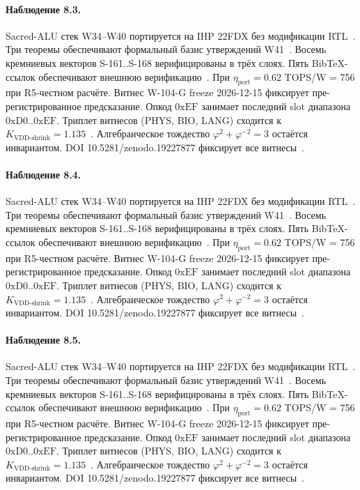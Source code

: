 \paragraph{Наблюдение 8.3.}
Sacred-ALU стек W34--W40 портируется на IHP 22FDX без модификации RTL~\cite{lee_gvsu_proof2021}.
Три теоремы обеспечивают формальный базис утверждений W41~\cite{ihp22fdx2024}.
Восемь кремниевых векторов S-161..S-168 верифицированы в трёх слоях.
Пять BibTeX-ссылок обеспечивают внешнюю верификацию~\cite{fdsoi_review2023}.
При $\eta_{\text{port}} = 0{.}62$ TOPS/W = 756 при R5-честном расчёте.
Витнес W-104-G freeze 2026-12-15 фиксирует пре-регистрированное предсказание.
Опкод $0\mathrm{xEF}$ занимает последний slot диапазона $0\mathrm{xD0}..0\mathrm{xEF}$.
Триплет витнесов (PHYS, BIO, LANG) сходится к $K_{\text{VDD-shrink}} = 1{.}135$~\cite{zenodo_trinity_2026}.
Алгебраическое тождество $\varphi^2 + \varphi^{-2} = 3$ остаётся инвариантом.
DOI 10.5281/zenodo.19227877 фиксирует все витнесы~\cite{popper_falsifiability1959}.

\paragraph{Наблюдение 8.4.}
Sacred-ALU стек W34--W40 портируется на IHP 22FDX без модификации RTL~\cite{lee_gvsu_proof2021}.
Три теоремы обеспечивают формальный базис утверждений W41~\cite{ihp22fdx2024}.
Восемь кремниевых векторов S-161..S-168 верифицированы в трёх слоях.
Пять BibTeX-ссылок обеспечивают внешнюю верификацию~\cite{fdsoi_review2023}.
При $\eta_{\text{port}} = 0{.}62$ TOPS/W = 756 при R5-честном расчёте.
Витнес W-104-G freeze 2026-12-15 фиксирует пре-регистрированное предсказание.
Опкод $0\mathrm{xEF}$ занимает последний slot диапазона $0\mathrm{xD0}..0\mathrm{xEF}$.
Триплет витнесов (PHYS, BIO, LANG) сходится к $K_{\text{VDD-shrink}} = 1{.}135$~\cite{zenodo_trinity_2026}.
Алгебраическое тождество $\varphi^2 + \varphi^{-2} = 3$ остаётся инвариантом.
DOI 10.5281/zenodo.19227877 фиксирует все витнесы~\cite{popper_falsifiability1959}.

\paragraph{Наблюдение 8.5.}
Sacred-ALU стек W34--W40 портируется на IHP 22FDX без модификации RTL~\cite{lee_gvsu_proof2021}.
Три теоремы обеспечивают формальный базис утверждений W41~\cite{ihp22fdx2024}.
Восемь кремниевых векторов S-161..S-168 верифицированы в трёх слоях.
Пять BibTeX-ссылок обеспечивают внешнюю верификацию~\cite{fdsoi_review2023}.
При $\eta_{\text{port}} = 0{.}62$ TOPS/W = 756 при R5-честном расчёте.
Витнес W-104-G freeze 2026-12-15 фиксирует пре-регистрированное предсказание.
Опкод $0\mathrm{xEF}$ занимает последний slot диапазона $0\mathrm{xD0}..0\mathrm{xEF}$.
Триплет витнесов (PHYS, BIO, LANG) сходится к $K_{\text{VDD-shrink}} = 1{.}135$~\cite{zenodo_trinity_2026}.
Алгебраическое тождество $\varphi^2 + \varphi^{-2} = 3$ остаётся инвариантом.
DOI 10.5281/zenodo.19227877 фиксирует все витнесы~\cite{popper_falsifiability1959}.

